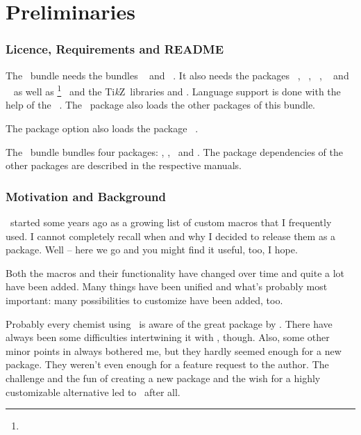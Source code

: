 \documentclass[load-preamble+]{cnltx-doc}
\newcommand*\TikZ{Ti\textit{k}Z}
\begin{document}
\part{Preliminaries}
\section{Licence, Requirements and \textsc{README}}
\license

The \chemmacros\ bundle needs the bundles ~\cite{bnd:l3kernel}
and ~\cite{bnd:l3packages}.  It also needs the packages
~\cite{pkg:siunitx},
~\cite{pkg:mathtools}, ~\cite{pkg:bm},
~\cite{pkg:nicefrac} and
~\cite{pkg:environ} as well as
\footnote{}~\cite{pkg:pgf} and the \TikZ\
libraries  and .  Language support is done with the
help of the \needpackage{translations}~\cite{pkg:translations}.  The
\chemmacros\ package also loads the other packages of this bundle.

The package option  also loads the package
~\cite{pkg:xspace}.

The \chemmacros\ bundle bundles four packages: \chemmacros, \chemformula,
\ghsystem\ and \chemgreek.  The package dependencies of the other packages are
described in the respective manuals.

\section{Motivation and Background}
\chemmacros\ started some years ago as a growing list of custom macros that I
frequently used.  I cannot completely recall when and why I decided to release
them as a package.  Well -- here we go and you might find it useful, too, I
hope.

Both the macros and their functionality have changed over time and quite a lot
have been added.  Many things have been unified and what's probably most
important: many possibilities to customize have been added, too.

Probably every chemist using \LaTeXe\ is aware of the great 
package by \hensel.  There have always been some difficulties intertwining it
with \chemmacros, though.  Also, some other minor points in 
always bothered me, but they hardly seemed enough for a new package.  They
weren't even enough for a feature request to the \pkg{mhchem} author.  The
challenge and the fun of creating a new package and the wish for a highly
customizable alternative led to \chemformula\ after all.
\end{document}
